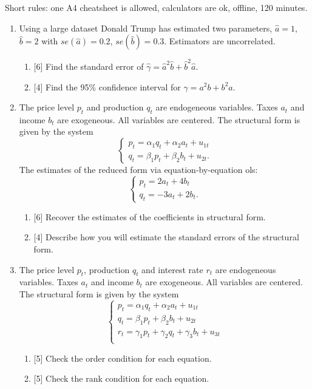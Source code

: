 \documentclass[12pt]{article}
\begin{document}
Short rules: one A4 cheatsheet is allowed, calculators are ok, offline, 120 minutes.

\begin{enumerate}
    \item Using a large dataset Donald Trump has estimated two parameters, $\hat a= 1$, $\hat b=2$ with $se(\hat a) = 0.2$, $se(\hat b) = 0.3$.
    Estimators are uncorrelated.

    \begin{enumerate}
        \item {[6]} Find the standard error of $\hat \gamma = \hat a^2 \hat b + \hat b^2 \hat a$.
        \item {[4]} Find the 95\% confidence interval for $\gamma = a^2 b + b^2 a$.
    \end{enumerate}
 
    \item The price level $p_t$ and production $q_t$ are endogeneous variables. 
    Taxes $a_t$ and income $b_t$ are exogeneous. 
    All variables are centered. 
    The structural form is given by the system
    \[
        \begin{cases}
            p_t = \alpha_1 q_t + \alpha_2 a_t + u_{1t} \\
            q_t = \beta_1 p_t + \beta_2 b_t + u_{2t}.
        \end{cases}        
    \]
    The estimates of the reduced form via equation-by-equation ols:
    \[
    \begin{cases}
        p_t = 2 a_t + 4 b_t \\
        q_t = - 3 a_t + 2 b_t.
    \end{cases}
    \]
    \begin{enumerate}
        \item {[6]} Recover the estimates of the coefficients in structural form.
        \item {[4]} Describe how you will estimate the standard errors of the structural form. 
    \end{enumerate}


    \item The price level $p_t$, production $q_t$ and interest rate $r_t$ are endogeneous variables. 
    Taxes $a_t$ and income $b_t$ are exogeneous. 
    All variables are centered. 
    The structural form is given by the system
    \[
        \begin{cases}
            p_t = \alpha_1 q_t + \alpha_2 a_t + u_{1t} \\
            q_t = \beta_1 p_t + \beta_2 b_t + u_{2t} \\
            r_t = \gamma_1 p_t + \gamma_2 q_t + \gamma_3 b_t + u_{3t} \\
        \end{cases}        
    \]
    \begin{enumerate}
        \item {[5]} Check the order condition for each equation. 
        \item {[5]} Check the rank condition for each equation.
    \end{enumerate}
    

\end{enumerate}
\end{document}
